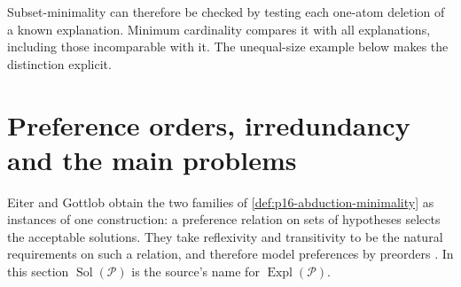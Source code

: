 Subset-minimality can therefore be checked by testing each one-atom
deletion of a known explanation. Minimum cardinality compares it with all
explanations, including those incomparable with it. The unequal-size example
below makes the distinction explicit.

\section{Preference orders, irredundancy and the main problems}
\label{sec:p15-w02c-p15-027-preference-orders}

Eiter and Gottlob obtain the two families of
\cref{def:p16-abduction-minimality} as instances of one construction:
a preference relation on sets of hypotheses selects the acceptable
solutions. They take reflexivity and transitivity to be the natural
requirements on such a relation, and therefore model preferences by
preorders \cite[manuscript p.~10]{EiterGottlobAbductionManuscript}.
In this section \(\operatorname{Sol}(\mathcal P)\) is the source's name
for \(\operatorname{Expl}(\mathcal P)\).

